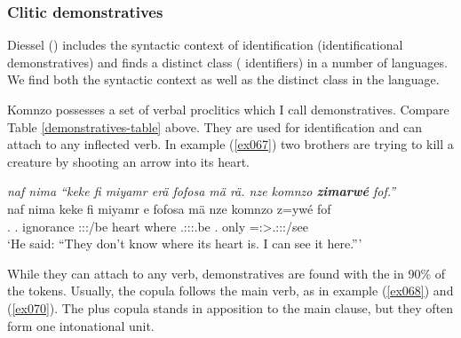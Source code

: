 \subsubsection{Clitic demonstratives} \label{demonstrative-identifiers}

Diessel (\citeyear{Diessel:2009tg}) includes the syntactic context of identification (identificational demonstratives) and finds a distinct class ( identifiers) in a number of languages. We find both the syntactic context as well as the distinct class in the language.%

Komnzo possesses a set of  verbal proclitics which I call  demonstratives. Compare Table \ref{demonstratives-table} above. They are used for identification and can attach to any inflected verb. In example (\ref{ex067}) two brothers are trying to kill a creature by shooting an arrow into its heart.

\begin{exe}
	\ex \emph{naf nima ``keke fi miyamr erä fofosa mä rä. nze komnzo \textbf{zimarwé} fof.''}\\
	\gll naf nima keke fi miyamr e fofosa mä  nze komnzo z=ywé fof\\
	\Tsg.\Erg{} \Quot{} \Neg{} \Third.\Abs{} ignorance \Stpl:\Sbj:\Nonpast:\Ipfv/be heart where \Tsg.\F:\Sbj:\Nonpast:\Ipfv.be \Fsg.\Erg{} only \Prox=\Fsg:\Sbj>\Tsg.\Masc:\Obj:\Nonpast:\Ipfv/see \Emph{}\\
	\trans `He said: ``They don't know where its heart is. I can see it here.'''\\
	\label{ex067}
\end{exe}

While they can attach to any verb,  demonstratives are found with the  in 90\% of the tokens. Usually, the copula follows the main verb, as in example (\ref{ex068}) and (\ref{ex070}). The   plus copula stands in apposition to the main clause, but they often form one intonational unit.

